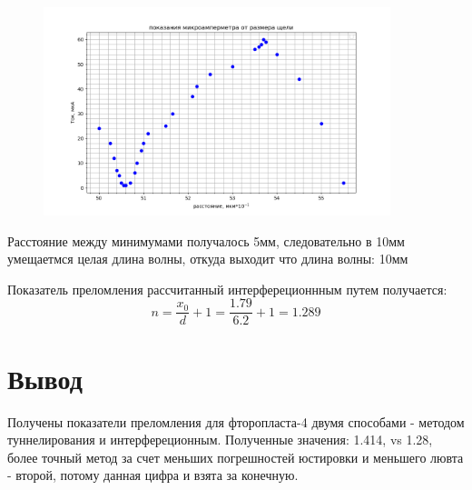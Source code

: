 \documentclass[a4paper, 12pt]{article}
\begin{document}
\begin{figure}[h!]
    \includegraphics[width=0.9\textwidth]{data/data5.png}
\end{figure}

Расстояние между минимумами получалось 5мм, следовательно в 10мм умещаетмся целая длина волны, откуда выходит что длина волны: 10мм

Показатель преломления рассчитанный интерфереционнным путем получается:
\[n = \frac{x_0}{d} + 1 = \frac{1.79}{6.2} + 1 = 1.289\]

\section{Вывод}
Получены показатели преломления для фторопласта-4 двумя способами - методом туннелирования и интерфереционным. Полученные значения:
1.414, vs 1.28, более точный метод за счет меньших погрешностей юстировки и меньшего лювта -  второй, потому данная цифра и взята за конечную.
\end{document}
